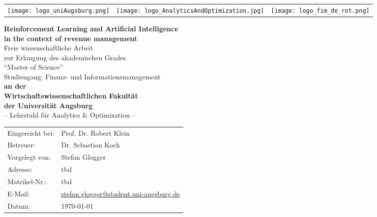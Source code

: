 \begin{titlepage}
\begin{spacing}{1.0}
	
\begin{tabularx}{\textwidth}{LYR}
	\texttt{[image: logo\_uniAugsburg.png]} &
	\texttt{[image: logo\_AnalyticsAndOptimization.jpg]} &
	\texttt{[image: logo\_fim\_de\_rot.png]}
\end{tabularx}
\vspace*{1.2cm}
\begin{center}
	{\huge \textbf{Reinforcement Learning and Artificial Intelligence\\
	in the context of revenue management\\}} 
\vspace*{1.2cm}
{\Large Freie wissenschaftliche Arbeit \\
zur Erlangung des akademischen Grades\\
\enquote{Master of Science}\\
Studiengang: Finanz- und Informationsmanagement
} 
\\
\vspace*{1cm}
{\Large \textbf{an der\\
Wirtschaftswissenschaftlichen Fakultät\\
der Universität Augsburg\\
}}
\vspace*{1cm}
{\Large – Lehrstuhl für Analytics \& Optimization –\\}
\vspace*{1cm}
{
\begin{tabular}{ll}
Eingereicht bei:& Prof. Dr. Robert Klein\\
Betreuer:& 			Dr. Sebastian Koch\\
Vorgelegt von:&	Stefan Glogger\\
Adresse:&			tbd\\
Matrikel-Nr.:&		tbd\\
E-Mail:&				\href{mailto:stefan.glogger@student.uni-augsburg.de}{stefan.glogger@student.uni-augsburg.de}\\
Datum:&				\today
\end{tabular}
}
\end{center}

\end{spacing}

\end{titlepage}
